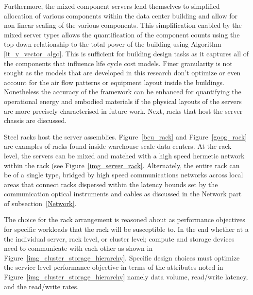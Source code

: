             Furthermore, the mixed component servers lend themselves to simplified allocation of various components within the data center building and allow for non-linear scaling of the various components. This simplification enabled by the mixed server types allows the quantification of the component counts using the top down relationship to the total power of the building using Algorithm~ \ref{it_y_vector_algo}. This is sufficient for building design tasks as it captures all of the components that influence life cycle cost models. Finer granularity is not sought as the models that are developed in this research don't optimize or even account for the air flow patterns or equipment layout inside the buildings. Nonetheless the accuracy of the framework can be enhanced for quantifying the operational energy and embodied materials if the physical layouts of the servers are more precisely characterised in future work. Next, racks that host the server chassis are discussed.
            
            
            Steel racks host the server assemblies. Figure~\ref{bcu_rack} and Figure~\ref{goog_rack} are examples of racks found inside warehouse-scale data centers. At the rack level, the servers can be mixed and matched with a high speed hermetic network within the rack (see Figure~\ref{img_server_rack}. Alternately, the entire rack can be of a single type, bridged by high speed communications networks across local areas that connect racks dispersed within the  latency bounds set by the communication optical instruments and cables as  discussed in the Network part of subsection~\ref{Network}. 
            
            The choice for the rack arrangement is reasoned about as performance objectives for specific workloads that the rack will be susceptible to. In the end whether at a the individual server, rack level, or cluster level; compute and storage devices need to communicate with each other as shown in Figure~\ref{img_cluster_storage_hierarchy}. Specific design choices must optimize the service level performance objective in terms of the attributes noted in Figure~\ref{img_cluster_storage_hierarchy} namely data volume, read/write latency, and the read/write rates.
            
